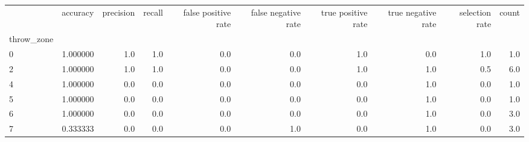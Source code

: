 \begin{tabular}{lrrrrrrrrr}
\toprule
{} &  accuracy &  precision &  recall &  false positive rate &  false negative rate &  true positive rate &  true negative rate &  selection rate &  count \\
throw\_zone &           &            &         &                      &                      &                     &                     &                 &        \\
\midrule
0          &  1.000000 &        1.0 &     1.0 &                  0.0 &                  0.0 &                 1.0 &                 0.0 &             1.0 &    1.0 \\
2          &  1.000000 &        1.0 &     1.0 &                  0.0 &                  0.0 &                 1.0 &                 1.0 &             0.5 &    6.0 \\
4          &  1.000000 &        0.0 &     0.0 &                  0.0 &                  0.0 &                 0.0 &                 1.0 &             0.0 &    1.0 \\
5          &  1.000000 &        0.0 &     0.0 &                  0.0 &                  0.0 &                 0.0 &                 1.0 &             0.0 &    1.0 \\
6          &  1.000000 &        0.0 &     0.0 &                  0.0 &                  0.0 &                 0.0 &                 1.0 &             0.0 &    3.0 \\
7          &  0.333333 &        0.0 &     0.0 &                  0.0 &                  1.0 &                 0.0 &                 1.0 &             0.0 &    3.0 \\
\bottomrule
\end{tabular}
